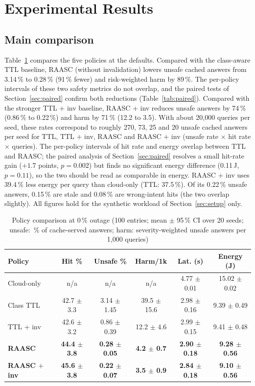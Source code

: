 \documentclass[journal]{IEEEtran}
\newcommand{\pct}{\,\%}
\begin{document}
\section{Experimental Results}\label{sec:results}
\subsection{Main comparison}\label{sec:main}
Table~\ref{tab:main} compares the five policies at the defaults. Compared with the class-aware TTL baseline, RAASC (without invalidation) lowers unsafe cached answers from 3.14\pct{} to 0.28\pct{} (91\pct{} fewer) and risk-weighted harm by 89\pct{}. The per-policy intervals of these two safety metrics do not overlap, and the paired tests of Section~\ref{sec:paired} confirm both reductions (Table~\ref{tab:paired}). Compared with the stronger TTL $+$ inv baseline, RAASC $+$ inv reduces unsafe answers by 74\pct{} (0.86\pct{} to 0.22\pct{}) and harm by 71\pct{} (12.2 to 3.5). With about 20,000 queries per seed, these rates correspond to roughly 270, 73, 25 and 20 unsafe cached answers per seed for TTL, TTL $+$ inv, RAASC and RAASC $+$ inv (unsafe rate $\times$ hit rate $\times$ queries). The per-policy intervals of hit rate and energy overlap between TTL and RAASC; the paired analysis of Section~\ref{sec:paired} resolves a small hit-rate gain ($+1.7$ points, $p=0.002$) but finds no significant energy difference (0.11\,J, $p=0.11$), so the two should be read as comparable in energy. RAASC $+$ inv uses 39.4\pct{} less energy per query than cloud-only (TTL: 37.5\pct{}). Of its 0.22\pct{} unsafe answers, 0.15\pct{} are stale and 0.08\pct{} are wrong-intent hits (the two overlap slightly). All figures hold for the synthetic workload of Section~\ref{sec:setup} only.

\begin{table}[!t]
\caption{Policy comparison at 0\pct{} outage (100 entries; mean $\pm$ 95\pct{} CI over 20 seeds; unsafe: \pct{} of cache-served answers; harm: severity-weighted unsafe answers per 1,000 queries)}
\label{tab:main}
\centering\small
\begin{tabular}{lccccc}
\toprule
Policy & Hit \% & Unsafe \% & Harm/1k & Lat. (s) & Energy (J)\\
\midrule
Cloud-only & n/a & n/a & n/a & 4.77 $\pm$ 0.01 & 15.02 $\pm$ 0.02\\
Class TTL & 42.7 $\pm$ 3.3 & 3.14 $\pm$ 1.45 & 39.5 $\pm$ 15.6 & 2.98 $\pm$ 0.16 & 9.39 $\pm$ 0.49\\
TTL $+$ inv & 42.6 $\pm$ 3.2 & 0.86 $\pm$ 0.39 & 12.2 $\pm$ 4.6 & 2.99 $\pm$ 0.15 & 9.41 $\pm$ 0.48\\
\textbf{RAASC} & \textbf{44.4 $\pm$ 3.8} & \textbf{0.28 $\pm$ 0.05} & \textbf{4.2 $\pm$ 0.7} & \textbf{2.90 $\pm$ 0.18} & \textbf{9.28 $\pm$ 0.56}\\
\textbf{RAASC $+$ inv} & \textbf{45.6 $\pm$ 3.8} & \textbf{0.22 $\pm$ 0.07} & \textbf{3.5 $\pm$ 0.9} & \textbf{2.84 $\pm$ 0.18} & \textbf{9.10 $\pm$ 0.56}\\
\bottomrule
\end{tabular}
\end{table}
\end{document}
